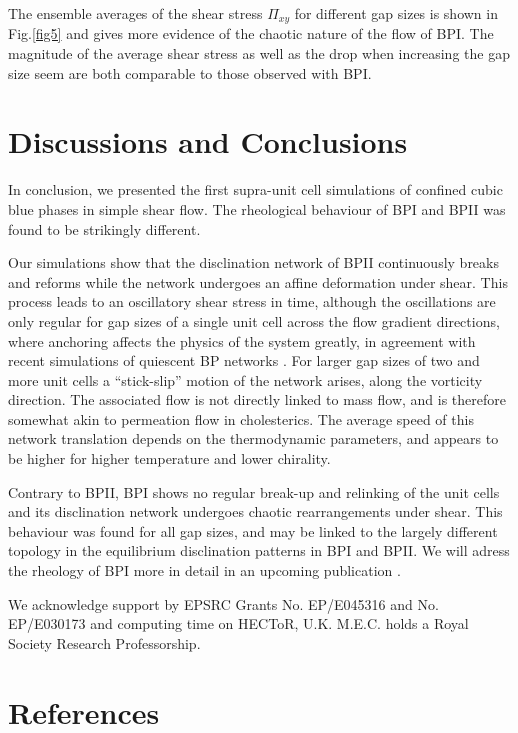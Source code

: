 \documentclass[12pt,twoside]{iopart}
\begin{document}
The ensemble averages of the shear stress $\Pi_{xy}$ for different gap sizes is shown in Fig.\ref{fig5} and gives more evidence of the chaotic nature of the flow of BPI.
The magnitude of the average shear stress as well as the drop when increasing the gap size seem are both comparable to those observed with BPI.

\section{Discussions and Conclusions}

In conclusion, we presented the first supra-unit cell simulations of confined cubic blue phases in simple shear flow.
The rheological behaviour of BPI and BPII was found to be strikingly different.

Our simulations show that the disclination network of BPII continuously breaks and reforms while the network undergoes an affine deformation under shear. This process leads to an oscillatory shear stress in time, although the oscillations are only regular for gap sizes of a single unit cell across the flow gradient directions, where anchoring affects the physics of the system greatly, in agreement with recent simulations of quiescent BP networks \cite{Fukuda:2010a, Fukuda:2010b, Ravnik:2011b}.
For larger gap sizes of two and more unit cells a ``stick-slip'' motion of the network arises, along the vorticity direction. The associated flow is not directly linked to mass flow, and is therefore somewhat akin to permeation flow in cholesterics. The average speed of this network translation depends on the thermodynamic parameters, and appears to be higher for higher temperature and lower chirality. 

Contrary to BPII, BPI shows no regular break-up and relinking of the unit cells and its disclination network undergoes chaotic rearrangements under shear.
This behaviour was found for all gap sizes, and may be linked to the largely different topology in the equilibrium disclination patterns in BPI and BPII.
We will adress the rheology of BPI more in detail in an upcoming publication \cite{Henrich:2012}.  

\ack
We acknowledge support by EPSRC Grants No. EP/E045316 and No. EP/E030173 and computing time on HECToR, U.K.
M.E.C. holds a Royal Society Research Professorship.


\section*{References}



\end{document}
